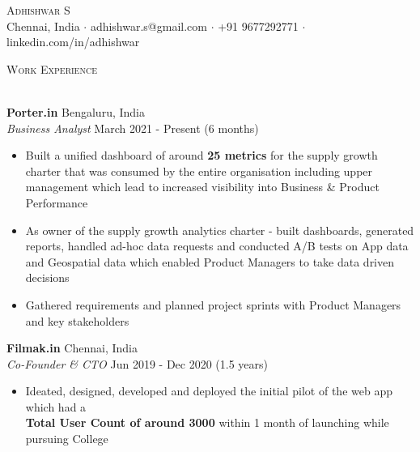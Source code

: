 \documentclass[a4paper]{article}
\newcommand{\lineunder} {
    \vspace*{-8pt} \\
    \hspace*{-18pt} \hrulefill \\
}
\newcommand{\header} [1] {
    {\hspace*{-18pt}\vspace*{6pt} \textsc{#1}}
    \vspace*{-6pt} \lineunder
}
\begin{document}
\vspace*{-40pt}

    

\vspace*{-10pt}
\begin{center}
    {\Huge \scshape {Adhishwar S}}\\
    Chennai, India $\cdot$ adhishwar.s@gmail.com $\cdot$ +91 9677292771 $\cdot$ linkedin.com/in/adhishwar\\
\end{center}

\header{Work Experience}
\vspace{1mm}


\textbf{Porter.in} \hfill Bengaluru, India\\
\textit{Business Analyst} \hfill March 2021 - Present (6 months)\\
\vspace{-1mm}
\begin{itemize} \itemsep 1pt
    \item Built a unified dashboard of around \textbf{25 metrics} for the supply growth charter that was consumed by the entire organisation including upper management which lead to increased visibility into Business \& Product Performance
    \item As owner of the supply growth analytics charter - built dashboards, generated reports, handled ad-hoc data requests and conducted A/B tests on App data and Geospatial data which enabled Product Managers to take data driven decisions
    \item Gathered requirements and planned project sprints with Product Managers and key stakeholders
\end{itemize}
\textbf{Filmak.in} \hfill Chennai, India\\
\textit{Co-Founder \& CTO} \hfill Jun 2019 - Dec 2020 (1.5 years)\\
\vspace{-1mm}
\begin{itemize} \itemsep 1pt
    \item Ideated, designed, developed and deployed the initial pilot of the web app which had a\\ \textbf{Total User Count of around 3000} within 1 month of launching while pursuing College
\end{itemize}
\end{document}
